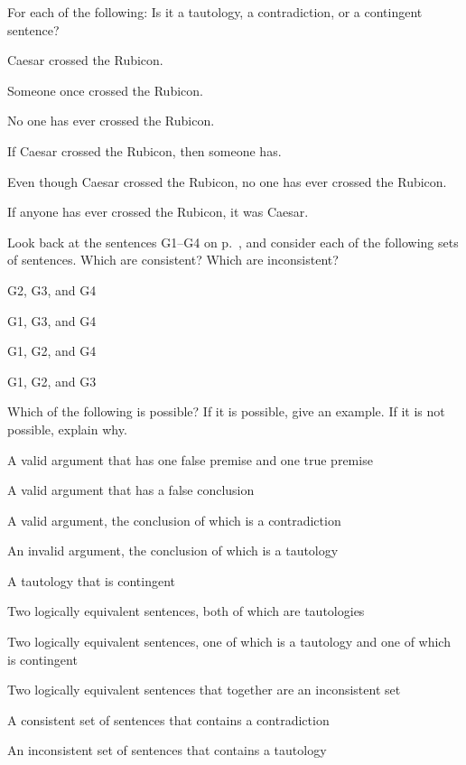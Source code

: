 \problempart
\label{pr.EnglishTautology}
For each of the following: Is it a tautology, a contradiction, or a contingent sentence?
\begin{earg}
\item Caesar crossed the Rubicon.
\item Someone once crossed the Rubicon.
\item No one has ever crossed the Rubicon.
\item If Caesar crossed the Rubicon, then someone has.
\item Even though Caesar crossed the Rubicon, no one has ever crossed the Rubicon.
\item If anyone has ever crossed the Rubicon, it was Caesar.
\end{earg}

\solutions
\problempart
\label{pr.MartianGiraffes}
Look back at the sentences G1--G4 on p.~\pageref{MartianGiraffes}, and consider each of the following sets of sentences. Which are consistent? Which are inconsistent?
\begin{earg}
\item G2, G3, and G4
\item G1, G3, and G4
\item G1, G2, and G4
\item G1, G2, and G3
\end{earg}

\solutions
\problempart
\label{pr.EnglishCombinations}
Which of the following is possible? If it is possible, give an example. If it is not possible, explain why.
\begin{earg}
\item A valid argument that has one false premise and one true premise
\item A valid argument that has a false conclusion
\item A valid argument, the conclusion of which is a contradiction
\item An invalid argument, the conclusion of which is a tautology
\item A tautology that is contingent
\item Two logically equivalent sentences, both of which are tautologies
\item Two logically equivalent sentences, one of which is a tautology and one of which is contingent
\item Two logically equivalent sentences that together are an inconsistent set
\item A consistent set of sentences that contains a contradiction
\item An inconsistent set of sentences that contains a tautology
\end{earg}


